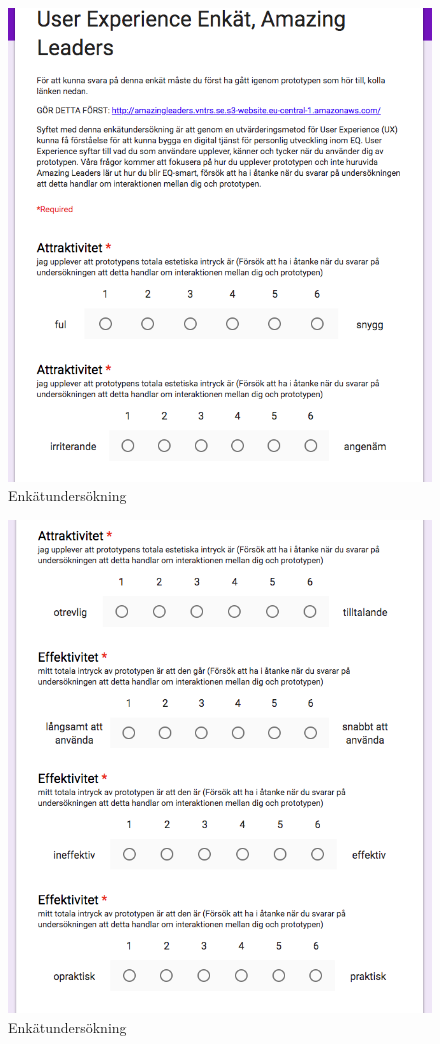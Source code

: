     
 \begin{figure} [H]
   \centering
   \includegraphics[scale=0.75]{form1.png}
  \captionsetup{justification=centering,margin=2cm}
  \caption{Enkätundersökning}
 \end{figure} 
 
  \begin{figure} [H]
   \centering
   \includegraphics[scale=0.75]{form2.png}
  \captionsetup{justification=centering,margin=2cm}
  \caption{Enkätundersökning}
 \end{figure} 

